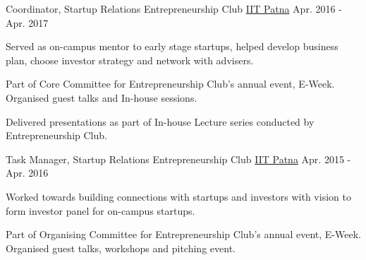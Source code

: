 
\begin{cvpositions}


\cvrole
	{Coordinator, Startup Relations} %
	{Entrepreneurship Club} %
	{\href{https://www.iitp.ac.in}{IIT Patna}} %
	{Apr. 2016 - Apr. 2017} %
	{\begin{cvitems} %
		\item {Served as on-campus mentor to early stage startups, helped develop business plan, choose investor strategy and network with advisers.}
		\item {Part of Core Committee for Entrepreneurship Club's annual event, E-Week. Organised guest talks and In-house sessions.}
		\item {Delivered presentations as part of In-house Lecture series conducted by Entrepreneurship Club.}
	\end{cvitems}}

\cvrole
	{Task Manager, Startup Relations} %
	{Entrepreneurship Club} %
	{\href{https://www.iitp.ac.in}{IIT Patna}} %
	{Apr. 2015 - Apr. 2016} %
	{\begin{cvitems} %
		\item {Worked towards building connections with startups and investors with vision to form investor panel for on-campus startups.}
		\item {Part of Organising Committee for Entrepreneurship Club's annual event, E-Week. Organised guest talks, workshops and pitching event.}
	\end{cvitems}}

\end{cvpositions}
